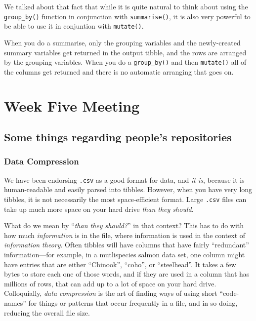 \documentclass[]{book}
\theoremstyle{definition}
\theoremstyle{definition}
\theoremstyle{remark}
\begin{document}
We talked about that fact that while it is quite natural to think about
using the \texttt{group\_by()} function in conjunction with
\texttt{summarise()}, it is also very powerful to be able to use it in
conjuntion with \texttt{mutate()}.

When you do a summarise, only the grouping variables and the
newly-created summary variables get returned in the output tibble, and
the rows are arranged by the grouping variables. When you do a
\texttt{group\_by()} and then \texttt{mutate()} all of the columns get
returned and there is no automatic arranging that goes on.

\chapter{Week Five Meeting}\label{week5}

\section{Some things regarding people's
repositories}\label{some-things-regarding-peoples-repositories}

\subsection{Data Compression}\label{data-compression}

We have been endorsing \texttt{.csv} as a good format for data, and
\emph{it is}, because it is human-readable and easily parsed into
tibbles. However, when you have very long tibbles, it is not necessarily
the most space-efficient format. Large \texttt{.csv} files can take up
much more space on your hard drive \emph{than they should}.

What do we mean by ``\emph{than they should?}'' in that context? This
has to do with how much \emph{information} is in the file, where
information is used in the context of \emph{information theory}. Often
tibbles will have columns that have fairly ``redundant''
information---for example, in a mutlispecies salmon data set, one column
might have entries that are either ``Chinook'', ``coho'', or
``steelhead''. It takes a few bytes to store each one of those words,
and if they are used in a column that has millions of rows, that can add
up to a lot of space on your hard drive. Colloquially, \emph{data
compression} is the art of finding ways of using short ``code-names''
for things or patterns that occur frequently in a file, and in so doing,
reducing the overall file size.
\end{document}
